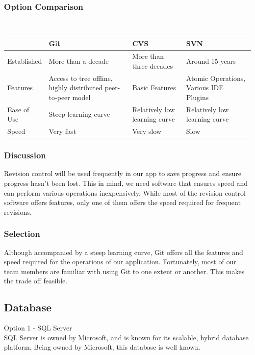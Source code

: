 \documentclass[onecolumn, draftclsnofoot,10pt, compsoc]{IEEEtran}
\begin{document}
{\subsubsection{Option Comparison} ~\\
\tablehead{}
\begin{supertabular}{|p{2.5cm}|p{4.5cm}|p{4.5cm}|p{4.5cm}|}
\hline
	\cite{JaxEnter}
	& Git
	& CVS
	& SVN\\
\hline
	Established
	& More than a decade
	& More than three decades
	& Around 15 years\\
\hline
	Features
	& Access to tree offline, highly distributed peer-to-peer model
	& Basic Features
	& Atomic Operations, Various IDE Plugins \\
\hline
	Ease of Use
	& Steep learning curve
	& Relatively low learning curve
	& Relatively low learning curve \\
\hline
	Speed
	& Very fast
	& Very slow
	& Slow \\
\hline
\end{supertabular}

\medskip

\subsubsection{Discussion}
{\noindent Revision control will be used frequently in our app to save progress and ensure progress hasn't been lost.
This in mind, we need software that ensures speed and can perform various operations inexpensively.
While most of the revision control software offers features, only one of them offers the speed required for frequent revisions. \par}

\medskip
\subsubsection{Selection}
{\noindent Although accompanied by a steep learning curve, Git offers all the features and speed required for the operations of our application.
Fortunately, most of our team members are familiar with using Git to one extent or another. This makes the trade off feasible. \par}







\newpage
\subsection{Database}
\noindent Option 1 - SQL Server \\
\noindent SQL Server is owned by Microsoft, and is known for its scalable, hybrid database platform. Being owned by Microsoft, this database is well known. \cite{SQLServer}

}
\end{document}

